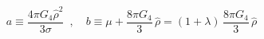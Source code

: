 \begin{equation}
a \equiv \frac{4\pi G_4\hat{\rho}^2}{3\sigma}\,\,\,,\,\,\,\,\,\,
b\equiv \mu+\frac{8\pi G_4}{3}\,\hat{\rho}=
(1+\lambda)\,\frac{8\pi G_4}{3}\,\hat{\rho}\end{equation}

